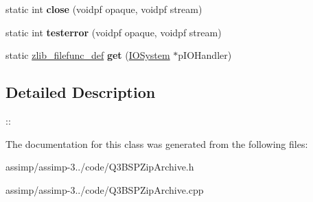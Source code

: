 \begin{DoxyCompactItemize}
\item 
\hypertarget{class_assimp_1_1_q3_b_s_p_1_1_i_o_system2_unzip_af53f7d918c19fd43b41652e9129f778e}{static int {\bfseries close} (voidpf opaque, voidpf stream)}\label{class_assimp_1_1_q3_b_s_p_1_1_i_o_system2_unzip_af53f7d918c19fd43b41652e9129f778e}

\item 
\hypertarget{class_assimp_1_1_q3_b_s_p_1_1_i_o_system2_unzip_a3362aadb648abf4f9ad378681140bb7f}{static int {\bfseries testerror} (voidpf opaque, voidpf stream)}\label{class_assimp_1_1_q3_b_s_p_1_1_i_o_system2_unzip_a3362aadb648abf4f9ad378681140bb7f}

\item 
\hypertarget{class_assimp_1_1_q3_b_s_p_1_1_i_o_system2_unzip_ab3fb296b6f00e7bc1121a9f33706dc64}{static \hyperlink{structzlib__filefunc__def__s}{zlib\+\_\+filefunc\+\_\+def} {\bfseries get} (\hyperlink{class_assimp_1_1_i_o_system}{I\+O\+System} $\ast$p\+I\+O\+Handler)}\label{class_assimp_1_1_q3_b_s_p_1_1_i_o_system2_unzip_ab3fb296b6f00e7bc1121a9f33706dc64}

\end{DoxyCompactItemize}


\subsection{Detailed Description}
\+:\+: 

The documentation for this class was generated from the following files\+:\begin{DoxyCompactItemize}
\item 
assimp/assimp-\/3../code/Q3\+B\+S\+P\+Zip\+Archive.\+h\item 
assimp/assimp-\/3../code/Q3\+B\+S\+P\+Zip\+Archive.\+cpp\end{DoxyCompactItemize}
